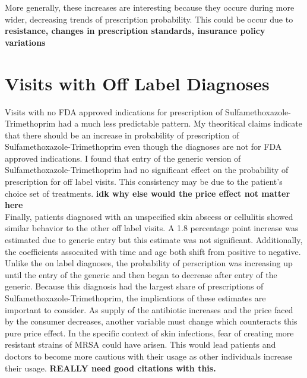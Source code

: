 \indent More generally, these increases are interesting because they occure during more wider, decreasing trends of prescription probability. This could be occur due to \textbf{resistance, changes in prescription standards, insurance policy variations}
\section{Visits with Off Label Diagnoses}
\indent Visits with no FDA approved indications for prescription of Sulfamethoxazole-Trimethoprim had a much less predictable pattern. My theoritical claims indicate that there should be an increase in probability of prescription of Sulfamethoxazole-Trimethoprim even though the diagnoses are not for FDA approved indications. I found that entry of the generic version of Sulfamethoxazole-Trimethoprim had no significant effect on the probability of prescription for off label visits. This consistency may be due to the patient's choice set of treatments. \textbf{idk why else would the price effect not matter here}\\
\indent Finally, patients diagnosed with an unspecified skin abscess or cellulitis showed similar behavior to the other off label visits. A 1.8 percentage point increase was estimated due to generic entry but this estimate was not significant. Additionally, the coefficients assocaited with time and age both shift from positive to negative. Unlike the on label diagnoses, the probability of perscription was increasing up until the entry of the generic and then began to decrease after entry of the generic. Because this diagnosis had the largest share of prescriptions of Sulfamethoxazole-Trimethoprim, the implications of these estimates are important to consider. As supply of the antibiotic increases and the price faced by the consumer decreases, another variable must change which counteracts this pure price effect. In the specific context of skin infections, fear of creating more resistant strains of MRSA could have arisen. This would lead patients and doctors to become more cautious with their usage as other individuals increase their usage. \textbf{REALLY need good citations with this.}